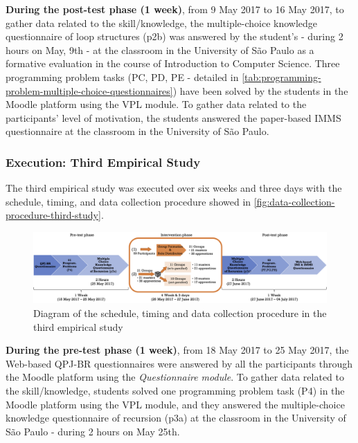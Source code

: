 \textbf{During the post-test phase (1 week)}, from 9 May 2017 to 16 May 2017, to gather data related to the skill/knowledge, the multiple-choice knowledge questionnaire of loop structures (p2b) was answered by the student’s - during 2 hours on May, 9th - at the classroom in the University of São Paulo as a formative evaluation in the course of Introduction to Computer Science. 
Three programming problem tasks (PC, PD, PE - detailed in \autoref{tab:programming-problem-multiple-choice-questionnaires}) have been solved by the students in the Moodle platform using the VPL module.
To gather data related to the participants' level of motivation, the students answered the paper-based IMMS questionnaire at the classroom in the University of São Paulo.

\subsubsection{Execution: Third Empirical Study}

The third empirical study was executed over six weeks and three days with the schedule, timing, and data collection procedure showed in \autoref{fig:data-collection-procedure-third-study}.

\begin{figure}[htb]
 \caption{Diagram of the schedule, timing and data collection procedure in the third empirical study}
 \label{fig:data-collection-procedure-third-study}
 \centering
 \includegraphics[width=1\textwidth]{images/chap-evaluation/data-collection-procedure-third-study.png}
 \fautor
\end{figure}

\textbf{During the pre-test phase (1 week)}, from 18 May 2017 to 25 May 2017, the Web-based QPJ-BR questionnaires were answered by all the participants through the Moodle platform using the \emph{Questionnaire module}.
To gather data related to the skill/knowledge, students solved one programming problem task (P4) in the Moodle platform using the VPL module, and they answered the multiple-choice knowledge questionnaire of recursion (p3a) at the classroom in the University of São Paulo - during 2 hours on May 25th.

